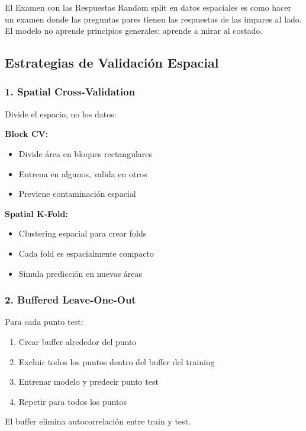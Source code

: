 \documentclass[12pt,a4paper]{article}
\begin{document}
\begin{analogia}{El Examen con las Respuestas}
Random split en datos espaciales es como hacer un examen donde las preguntas pares tienen las respuestas de las impares al lado. El modelo no aprende principios generales; aprende a mirar al costado.
\end{analogia}

\subsection{Estrategias de Validación Espacial}

\subsubsection{1. Spatial Cross-Validation}

Divide el espacio, no los datos:

\textbf{Block CV:}
\begin{itemize}
    \item Divide área en bloques rectangulares
    \item Entrena en algunos, valida en otros
    \item Previene contaminación espacial
\end{itemize}

\textbf{Spatial K-Fold:}
\begin{itemize}
    \item Clustering espacial para crear folds
    \item Cada fold es espacialmente compacto
    \item Simula predicción en nuevas áreas
\end{itemize}

\subsubsection{2. Buffered Leave-One-Out}

Para cada punto test:
\begin{enumerate}
    \item Crear buffer alrededor del punto
    \item Excluir todos los puntos dentro del buffer del training
    \item Entrenar modelo y predecir punto test
    \item Repetir para todos los puntos
\end{enumerate}

El buffer elimina autocorrelación entre train y test.
\end{document}

